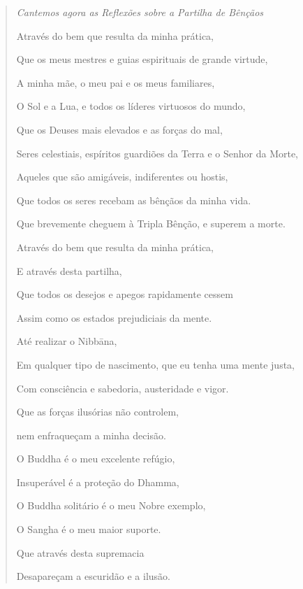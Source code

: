 \begin{quote}
\emph{Cantemos agora as Reflexões sobre a Partilha de Bênçãos}

Através do bem que resulta da minha prática,

Que os meus mestres e guias espirituais de grande virtude,

A minha mãe, o meu pai e os meus familiares,

O Sol e a Lua, e todos os líderes virtuosos do mundo,

Que os Deuses mais elevados e as forças do mal,

Seres celestiais, espíritos guardiões da Terra e o Senhor da Morte,

Aqueles que são amigáveis, indiferentes ou hostis,

Que todos os seres recebam as bênçãos da minha vida.

Que brevemente cheguem à Tripla Bênção, e superem a morte.

Através do bem que resulta da minha prática,

E através desta partilha,

Que todos os desejos e apegos rapidamente cessem

Assim como os estados prejudiciais da mente.

Até realizar o Nibbāna,

Em qualquer tipo de nascimento, que eu tenha uma mente justa,

Com consciência e sabedoria, austeridade e vigor.

Que as forças ilusórias não controlem,

nem enfraqueçam a minha decisão.

O Buddha é o meu excelente refúgio,

Insuperável é a proteção do Dhamma,

O Buddha solitário é o meu Nobre exemplo,

O Sangha é o meu maior suporte.

Que através desta supremacia

Desapareçam a escuridão e a ilusão.
\end{quote}

